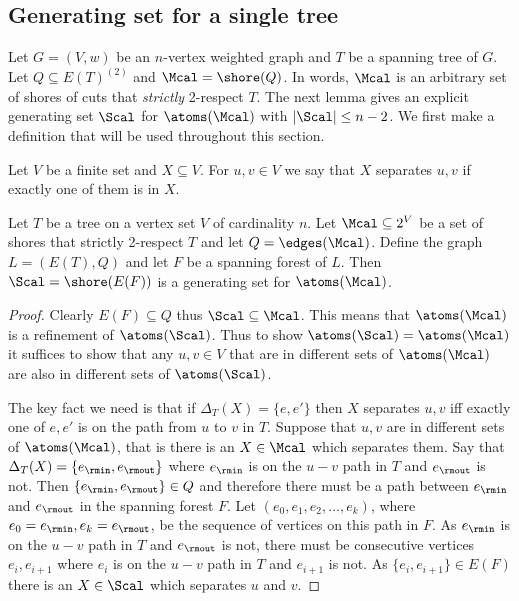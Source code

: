 \subsection{Generating set for a single tree} \label{sec:single-tree}
Let $G = (V,w)$ be an $n$-vertex weighted graph and $T$ be a spanning tree of $G$.  Let $Q \subseteq E(T)^{(2)}$ and 
$\Mcal = \shore(Q)$.  In words, $\Mcal$ is an arbitrary set of shores of cuts that \emph{strictly} 2-respect $T$.  
The next lemma gives an explicit generating set $\Scal$ for $\atoms(\Mcal)$ with $|\Scal| \le n-2$.  We first make a definition
that will be used throughout this section.

\begin{definition}[separate]
Let $V$ be a finite set and $X \subseteq V$.  For $u,v \in V$ we say that $X$ separates $u,v$ if exactly one of 
them is in $X$.
\end{definition}

\begin{lemma}
\label{lem:spanning}
Let $T$ be a tree on a vertex set $V$ of cardinality $n$.  Let $\Mcal \subseteq 2^V$ be a set of shores that strictly 2-respect $T$ and let 
$Q = \edges(\Mcal)$.  Define the graph $L = (E(T), Q)$ and let $F$ be a spanning forest of $L$.  
Then $\Scal = \shore(E(F))$ is a generating set for $\atoms(\Mcal)$.
\end{lemma}

\begin{proof}
Clearly $E(F) \subseteq Q$ thus $\Scal \subseteq \Mcal$.  This means that $\atoms(\Mcal)$ is a refinement of $\atoms(\Scal)$.  
Thus to show $\atoms(\Scal) = \atoms(\Mcal)$ it suffices to show that any $u,v \in V$ that are in different sets of $\atoms(\Mcal)$ are also in 
different sets of $\atoms(\Scal)$.  
 
The key fact we need is that if $\Delta_T(X) = \{e,e'\}$ then $X$ separates $u,v$ iff exactly one of $e,e'$ is on the 
path from $u$ to $v$ in $T$.  Suppose that $u,v$ are in different sets of $\atoms(\Mcal)$, that is there is an $X \in \Mcal$ 
which separates them.  Say that $\Delta_T(X) = \{e_\rmin,e_\rmout\}$ where $e_\rmin$ is on the $u-v$ path in 
$T$ and $e_\rmout$ is not.  Then $\{e_\rmin,e_\rmout\} \in Q$ and therefore there must be a path between $e_\rmin$ and $e_\rmout$ in the spanning forest 
$F$.  Let $(e_0,e_1, e_2, \ldots, e_k)$, where $e_0 = e_\rmin, e_k = e_\rmout$, be the sequence of vertices on this path in $F$.  As $e_\rmin$ is on the $u-v$ path in $T$ and $e_\rmout$ is 
not, there must be consecutive vertices $e_i,e_{i+1}$ where $e_i$ is on the $u-v$ path in $T$ and $e_{i+1}$ is not.  As $\{e_i, e_{i+1}\} \in E(F)$ there is 
an $X \in \Scal$ which separates $u$ and $v$.  
\end{proof}

